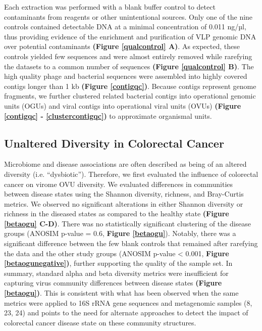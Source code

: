 \documentclass[12pt,]{article}
\begin{document}
Each extraction was performed with a blank buffer control to detect
contaminants from reagents or other unintentional sources. Only one of
the nine controls contained detectable DNA at a minimal concentration of
0.011 ng/µl, thus providing evidence of the enrichment and purification
of VLP genomic DNA over potential contaminants \textbf{(Figure
\ref{qualcontrol} A)}. As expected, these controls yielded few sequences
and were almost entirely removed while rarefying the datasets to a
common number of sequences \textbf{(Figure \ref{qualcontrol} B)}. The
high quality phage and bacterial sequences were assembled into highly
covered contigs longer than 1 kb \textbf{(Figure \ref{contigqc})}.
Because contigs represent genome fragments, we further clustered related
bacterial contigs into operational genomic units (OGUs) and viral
contigs into operational viral units (OVUs) \textbf{(Figure
\ref{contigqc} - \ref{clustercontigqc})} to approximate organismal
units.

\subsection{Unaltered Diversity in Colorectal
Cancer}\label{unaltered-diversity-in-colorectal-cancer}

Microbiome and disease associations are often described as being of an
altered diversity (i.e. ``dysbiotic''). Therefore, we first evaluated
the influence of colorectal cancer on virome OVU diversity. We evaluated
differences in communities between disease states using the Shannon
diversity, richness, and Bray-Curtis metrics. We observed no significant
alterations in either Shannon diversity or richness in the diseased
states as compared to the healthy state \textbf{(Figure \ref{betaogu}
C-D)}. There was no statistically significant clustering of the disease
groups (ANOSIM p-value = 0.6, \textbf{Figure \ref{betaogu}}). Notably,
there was a significant difference between the few blank controls that
remained after rarefying the data and the other study groups (ANOSIM
p-value \textless{} 0.001, \textbf{Figure \ref{betaogunegative})},
further supporting the quality of the sample set. In summary, standard
alpha and beta diversity metrics were insufficient for capturing virus
community differences between disease states \textbf{(Figure
\ref{betaogu})}. This is consistent with what has been observed when the
same metrics were applied to 16S rRNA gene sequences and metagenomic
samples (8, 23, 24) and points to the need for alternate approaches to
detect the impact of colorectal cancer disease state on these community
structures.
\end{document}
